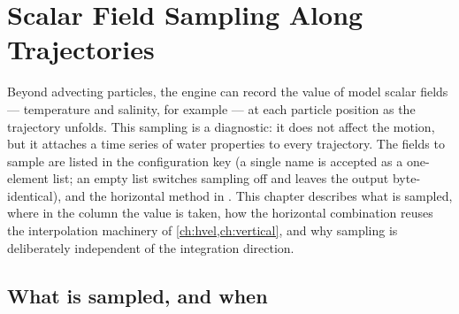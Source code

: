 \chapter{Scalar Field Sampling Along Trajectories}\label{ch:sampling}

Beyond advecting particles, the engine can record the value of model scalar fields
--- temperature and salinity, for example --- at each
particle position as the trajectory unfolds. This sampling is a diagnostic: it does
not affect the motion, but it attaches a time series of water properties to every
trajectory. The fields to sample are listed in the configuration key
 (a single name is accepted as a one-element list; an empty list switches
sampling off and leaves the output byte-identical), and the horizontal method in
. This chapter
describes what is sampled, where in the column the value is taken, how the horizontal
combination reuses the interpolation machinery of \cref{ch:hvel,ch:vertical}, and why
sampling is deliberately independent of the integration direction.

\section{What is sampled, and when}\label{sec:samp-what}

